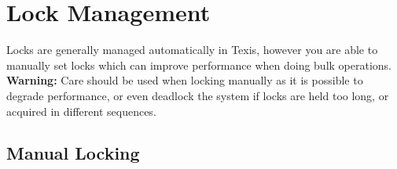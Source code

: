 %
%
%
%
%
%
%

\section{Lock Management}

Locks are generally managed automatically in Texis, however you are able to
manually set locks which can improve performance when doing bulk operations.
{\bf Warning:} Care should be used when locking manually as it is possible to
degrade performance, or even deadlock the system if locks are held too long, or
acquired in different sequences.

\subsection{Manual Locking}

